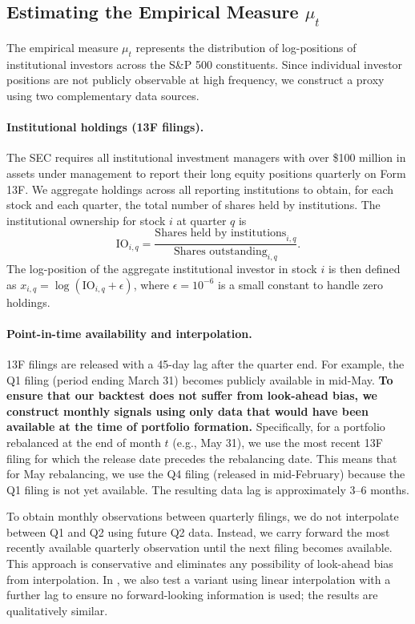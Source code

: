 \subsection{Estimating the Empirical Measure $\mu_t$}

The empirical measure $\mu_t$ represents the distribution of log-positions of
institutional investors across the S\&P 500 constituents. Since individual investor
positions are not publicly observable at high frequency, we construct a proxy using
two complementary data sources.

\paragraph{Institutional holdings (13F filings).} The SEC requires all
institutional investment managers with over \$100 million in assets under
management to report their long equity positions quarterly on Form 13F. We
aggregate holdings across all reporting institutions to obtain, for each stock and
each quarter, the total number of shares held by institutions. The institutional
ownership for stock $i$ at quarter $q$ is
\[
    \mathrm{IO}_{i,q} = \frac{\text{Shares held by institutions}_{i,q}}{\text{Shares
    outstanding}_{i,q}}.
\]
The log-position of the aggregate institutional investor in stock $i$ is then
defined as $x_{i,q} = \log(\mathrm{IO}_{i,q} + \epsilon)$, where
$\epsilon = 10^{-6}$ is a small constant to handle zero holdings.

\paragraph{Point-in-time availability and interpolation.} 13F filings are released
with a 45-day lag after the quarter end. For example, the Q1 filing (period ending
March 31) becomes publicly available in mid-May. \textbf{To ensure that our
backtest does not suffer from look-ahead bias, we construct monthly signals using
only data that would have been available at the time of portfolio formation.}
Specifically, for a portfolio rebalanced at the end of month $t$ (e.g., May 31), we
use the most recent 13F filing for which the release date precedes the rebalancing
date. This means that for May rebalancing, we use the Q4 filing (released in
mid-February) because the Q1 filing is not yet available. The resulting data lag is
approximately 3--6 months.

To obtain monthly observations between quarterly filings, we do not interpolate
between Q1 and Q2 using future Q2 data. Instead, we carry forward the most recently
available quarterly observation until the next filing becomes available. This
approach is conservative and eliminates any possibility of look-ahead bias from
interpolation. In , we also test a variant using linear
interpolation with a further lag to ensure no forward-looking information is used;
the results are qualitatively similar.

